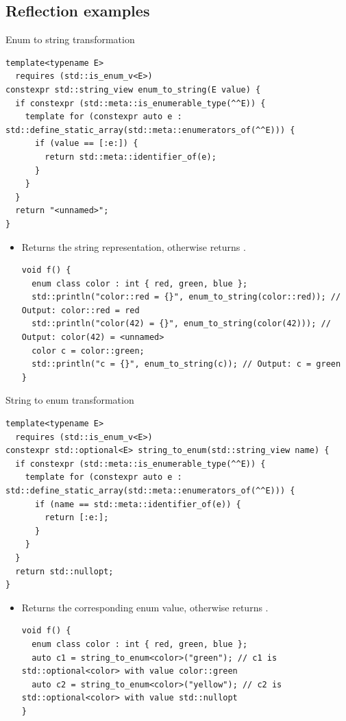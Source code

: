 \subsection{Reflection examples}

\begin{frame}[t,fragile]{Enum to string transformation}
\begin{lstlisting}
template<typename E>
  requires (std::is_enum_v<E>)
constexpr std::string_view enum_to_string(E value) {
  if constexpr (std::meta::is_enumerable_type(^^E)) {
    template for (constexpr auto e : std::define_static_array(std::meta::enumerators_of(^^E))) {
      if (value == [:e:]) {
        return std::meta::identifier_of(e);
      }
    }
  }
  return "<unnamed>";
}
\end{lstlisting}

\begin{itemize}
  \item Returns the string representation, otherwise returns .
\begin{lstlisting}
void f() {
  enum class color : int { red, green, blue };
  std::println("color::red = {}", enum_to_string(color::red)); // Output: color::red = red
  std::println("color(42) = {}", enum_to_string(color(42))); // Output: color(42) = <unnamed>
  color c = color::green;
  std::println("c = {}", enum_to_string(c)); // Output: c = green
}
\end{lstlisting}
\end{itemize}
\end{frame}

\begin{frame}[t,fragile]{String to enum transformation}
\begin{lstlisting}
template<typename E>
  requires (std::is_enum_v<E>)
constexpr std::optional<E> string_to_enum(std::string_view name) {
  if constexpr (std::meta::is_enumerable_type(^^E)) {
    template for (constexpr auto e : std::define_static_array(std::meta::enumerators_of(^^E))) {
      if (name == std::meta::identifier_of(e)) {
        return [:e:];
      }
    }
  }
  return std::nullopt;
}
\end{lstlisting}

\begin{itemize}
  \item Returns the corresponding enum value, otherwise returns .
\begin{lstlisting}
void f() {
  enum class color : int { red, green, blue };
  auto c1 = string_to_enum<color>("green"); // c1 is std::optional<color> with value color::green
  auto c2 = string_to_enum<color>("yellow"); // c2 is std::optional<color> with value std::nullopt
}
\end{lstlisting}
\end{itemize}
\end{frame}


